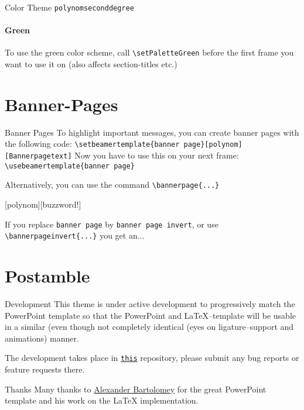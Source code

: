 \documentclass[fragile=singleslide]{beamer}
\begin{document}
\setPaletteGreen
\begin{frame}[fragile=singleslide]{Color Theme \texttt{polynomseconddegree}}
  \framesubtitle{Green}

  To use the green color scheme, call \verb|\setPaletteGreen|
  before the first frame you want to use it on (also affects
  section-titles etc.) \\
  \paletteColors
  
\end{frame}
\setPaletteBlue

\section{Banner-Pages}
\begin{frame}[fragile=singleslide]{Banner Pages}
  To highlight important messages, you can create banner pages with the
  following code:
  \verb|\setbeamertemplate{banner page}[polynom][Bannerpagetext]|
  Now you have to use this on your next frame:
  \verb|\usebeamertemplate{banner page}|

  Alternatively, you can use the command
  \verb|\bannerpage{...}|
\end{frame}

[polynom][buzzword!]
\begin{frame}
\end{frame}

\begin{frame}[fragile=singleslide]
  If you replace \verb|banner page| by
  \verb|banner page invert|, or use \verb|\bannerpageinvert{...}|
  you get an...
\end{frame}



\section{Postamble}
\begin{frame}{Development}
  This theme is under active development to progressively match the
  PowerPoint template so that the PowerPoint and LaTeX--template will
  be usable in a similar (even though not completely identical (eyes on
  ligature--support and animations) manner.

  The development takes place in
  \href{https://git.rwth-aachen.de/ACHinrichs/LaTeX-templates/}{\texttt{this}}
  repository, please submit any bug reports or feature requests there.
\end{frame}

\begin{frame}{Thanks}
  Many thanks to \href{https://www.occloxium.com/}{Alexander Bartolomey} for 
  the great PowerPoint template and his work on the LaTeX implementation. 
\end{frame}
\end{document}
